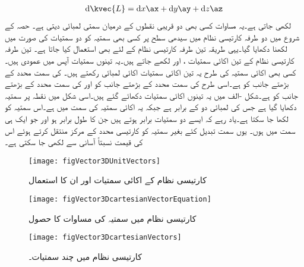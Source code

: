 \begin{align}\label{مساوات_سمتیہ_کارتیسی_چھوٹا_فاصلہ}
\dif \kvec{L}=\dif x \ax+\dif y \ay+\dif z \az
\end{align}
لکھی جاتی ہے۔یہ مساوات کسی بھی دو قریبی نقطوں کے درمیان سمتی لمبائی دیتی ہے۔
حصہ   کے شروع میں دو طرفہ کارتیسی نظام  میں سیدھی سطح پر کسی بھی سمتیہ کو دو سمتیات کی صورت میں لکھنا دکھایا گیا۔یہی طریقہ تین طرفہ کارتیسی نظام کے لئے بھی استعمال کیا جاتا ہے۔ تین طرفہ کارتیسی نظام کے تین اکائی سمتیات ،  اور  لکھے جاتے ہیں۔یہ تینوں سمتیات آپس میں عمودی ہیں۔کسی بھی اکائی سمتیہ کی طرح یہ تین اکائی سمتیات اکائی لمبائی رکھتے ہیں۔  کی سمت  محدد کے بڑھتے جانب کو ہے۔اسی طرح  کی سمت  محدد کے بڑھتے جانب کو اور  کی سمت  محدد کے بڑھتے جانب کو ہے۔شکل -الف میں یہ تینوں اکائی سمتیات دکھائے گئے ہیں۔اسی شکل میں نقطہ  پر سمتیہ دکھایا گیا ہے جس کی لمبائی دو کے برابر ہے جبکہ یہ اکائی سمتیہ  کی سمت میں ہے۔اس سمتیہ کو  لکھا جا سکتا ہے۔یاد رہے کہ ایسے دو سمتیات برابر ہوتے ہیں جن کا طول برابر ہو اور جو ایک ہی سمت میں ہوں۔ یوں سمت تبدیل کئے بغیر سمتیہ کو کارتیسی محدد کے مرکز منتقل کرتے ہوئے اس کی قیمت نسبتاً آسانی سے لکھی جا سکتی ہے۔
\begin{figure}
\centering
\texttt{[image: figVector3DUnitVectors]}
\caption{کارتیسی نظام کے اکائی سمتیات اور ان کا استعمال}
\label{شکل_سمتیہ_کارتیسی_تین_اکائی_سمتیات}
\end{figure}
%
\begin{figure}
\centering
\texttt{[image: figVector3DcartesianVectorEquation]}
\caption{کارتیسی نظام میں سمتیہ کی مساوات کا حصول}
\label{شکل_سمتیہ_کارتیسی_سمتیہ_کی_مساوات}
\end{figure}
%
\begin{figure}
\centering
\texttt{[image: figVector3DcartesianVectors]}
\caption{کارتیسی نظام میں چند سمتیات۔}
\label{شکل_سمتیہ_کارتیسی_چند_سمتیات}
\end{figure}
%

